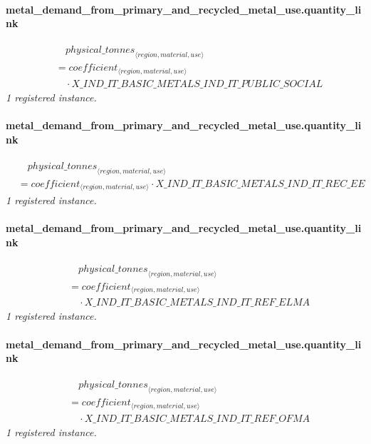 \documentclass[11pt]{article}
\begin{document}
\paragraph{metal\_demand\_from\_primary\_and\_recycled\_metal\_use.quantity\_link}
\begin{align*}
&\quad {physical\_tonnes}_{\langle region, material, use\rangle}\\
&= coefficient_{\langle region, material, use\rangle}\\
&\quad {}\cdot X\_IND\_IT\_BASIC\_METALS\_IND\_IT\_PUBLIC\_SOCIAL
\end{align*}
\noindent\emph{1 registered instance.}\par
\paragraph{metal\_demand\_from\_primary\_and\_recycled\_metal\_use.quantity\_link}
\begin{align*}
&\quad {physical\_tonnes}_{\langle region, material, use\rangle}\\
&= coefficient_{\langle region, material, use\rangle} \cdot X\_IND\_IT\_BASIC\_METALS\_IND\_IT\_REC\_EE
\end{align*}
\noindent\emph{1 registered instance.}\par
\paragraph{metal\_demand\_from\_primary\_and\_recycled\_metal\_use.quantity\_link}
\begin{align*}
&\quad {physical\_tonnes}_{\langle region, material, use\rangle}\\
&= coefficient_{\langle region, material, use\rangle}\\
&\quad {}\cdot X\_IND\_IT\_BASIC\_METALS\_IND\_IT\_REF\_ELMA
\end{align*}
\noindent\emph{1 registered instance.}\par
\paragraph{metal\_demand\_from\_primary\_and\_recycled\_metal\_use.quantity\_link}
\begin{align*}
&\quad {physical\_tonnes}_{\langle region, material, use\rangle}\\
&= coefficient_{\langle region, material, use\rangle}\\
&\quad {}\cdot X\_IND\_IT\_BASIC\_METALS\_IND\_IT\_REF\_OFMA
\end{align*}
\noindent\emph{1 registered instance.}\par
\end{document}
